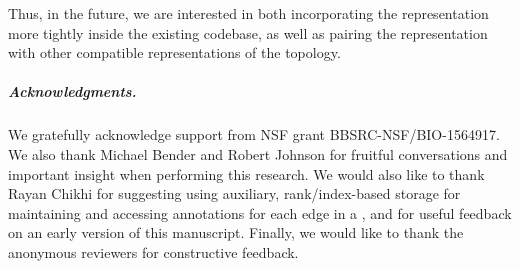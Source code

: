 
Thus, in the future, we are interested in both incorporating the \rainbowfish
representation more tightly inside the existing \vari codebase, as well as
pairing the \rainbowfish representation with other compatible representations of the
\dbg topology.  


\subparagraph*{Acknowledgments.}
We gratefully acknowledge support from NSF grant BBSRC-NSF/BIO-1564917. We also
thank Michael Bender and Robert Johnson for fruitful conversations and important
insight when performing this research. We would also like to thank Rayan
Chikhi for suggesting using auxiliary, rank/index-based storage for maintaining and
accessing annotations for each edge in a \dbg, and for useful feedback on an early
version of this manuscript.  Finally, we would like to thank the anonymous reviewers
for constructive feedback.



%




%

